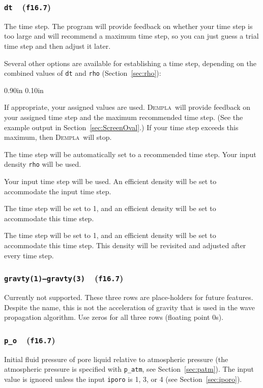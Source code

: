 \documentclass[letterpaper,11pt]{article}
\newcommand{\Dempla}{\textsc{Dempla}}
\newcommand{\Var}[2]{\texttt{#1}\ \  (\texttt{#2})}
\newlength{\Labelwidth}
\newcommand{\Entrylabel}[1]{\makebox[\Labelwidth][r]{\texttt{#1}}}
\newenvironment{Options}
{\begin{list}{}{%
\renewcommand{\makelabel}{\Entrylabel}%
\setlength{\leftmargin} {0.90in}%
\setlength{\rightmargin}{0.00in}%
\setlength{\labelsep}   {0.10in}%
\setlength{\labelwidth} {\Labelwidth}%
}}
{\end{list}}
\begin{document}
\subsubsection[\texttt{dt}]{\Var{dt}{f16.7}}\label{sec:dt}
The time step.  
The program will provide feedback on whether your time
step is too large and will recommend a maximum time step, so you can
just guess a trial time step and then adjust it later.
\par
Several other options are available for establishing a time step,
depending on the combined values of \texttt{dt} and \texttt{rho}
(Section~\ref{sec:rho}):
\begin{Options}
\item[dt>0, rho>0]
If appropriate, your assigned values are used.  
\Dempla\ will provide feedback on your assigned time step and the maximum
recommended time step.
(See the example output in Section~\ref{sec:ScreenOval}.)
If your time step exceeds this maximum, then \Dempla\ will stop.
\item[dt=0, rho>0]
The time step will be automatically set to a recommended time step.
Your input density \texttt{rho} will be used.
\item[dt>0, rho=0]
Your input time step will be used.
An efficient density will be set to accommodate the input time step.
\item[dt=0, rho=0]
The time step will be set to 1, and
an efficient density will be set to accommodate this time step.
\item[dt<0, rho<0]
The time step will be set to 1, and
an efficient density will be set to accommodate this time step.
This density will be revisited and adjusted after every time step.
\end{Options}
%
\subsubsection[\texttt{gravty}]{\Var{gravty(1)--gravty(3)}{f16.7}}\label{sec:gravty}
Currently not supported.
These three rows are place-holders for future features.
Despite the name, this is not the acceleration of gravity
that is used in the wave propagation algorithm.
Use zeros for all three rows (floating point 0s).
%
\subsubsection[\texttt{p\_o}]{\Var{p\_o}{f16.7}}\label{sec:po}
Initial fluid pressure of pore liquid relative to atmospheric
pressure (the atmospheric pressure is specified with
\texttt{p\_atm}, see Section~\ref{sec:patm}).
The input value is ignored unless the input
\texttt{iporo} is 1, 3, or 4 (see Section~\ref{sec:iporo}).
%
\end{document}
